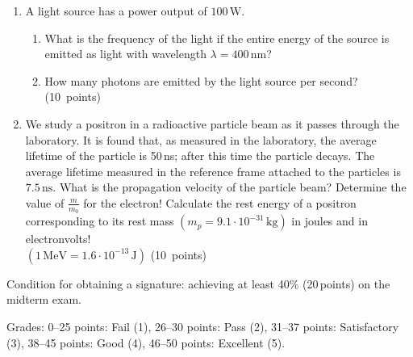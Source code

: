 \documentclass[12pt]{letter}
\begin{document}
\begin{enumerate}
\bigskip
\item A light source has a power output of $100\,\text{W}$.
\begin{enumerate}
    \item What is the frequency of the light if the entire energy of the source is emitted as light with wavelength $\lambda = 400\,\text{nm}$?
    \item How many photons are emitted by the light source per second? \hfill (10~points)
\end{enumerate}


\bigskip
\item We study a positron in a radioactive particle beam as it passes through the laboratory. It is found that, as measured in the laboratory, the average lifetime of the particle is 50\,ns; after this time the particle decays. The average lifetime measured in the reference frame attached to the particles is $7.5\,\text{ns}$. What is the propagation velocity of the particle beam? Determine the value of $\frac{m}{m_0}$ for the electron! Calculate the rest energy of a positron corresponding to its rest mass $(m_p = 9.1 \cdot 10^{-31}\,\text{kg})$ in joules and in electronvolts! \\ $(1\,\text{MeV} = 1.6 \cdot 10^{-13}\,\text{J})$ \hfill (10~points)
\end{enumerate}


Condition for obtaining a signature: achieving at least 40\% (20\,points) on the midterm exam.

Grades: 0–25 points: Fail (1), 26–30 points: Pass (2), 31–37 points: Satisfactory (3), 38–45 points: Good (4), 46–50 points: Excellent (5).


\vfill
\end{document}
